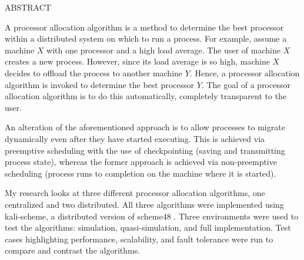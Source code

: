 ABSTRACT

A processor allocation algorithm is a method to determine the best processor
within a distributed system on which to run a process.  For example, assume
a machine $X$ with one processor and a high load average.  The user of
machine $X$ creates a new process.  However, since its load average is so
high, machine $X$ decides to offload the process to another machine $Y$.
Hence, a processor allocation algorithm is invoked to determine the best
processor $Y$.  The goal of a processor allocation algorithm is to do this
automatically, completely transparent to the user.

An alteration of the aforementioned approach is to allow processes to
migrate dynamically even after they have started executing.  This is
achieved via preemptive scheduling with the use of checkpointing (saving and
transmitting process state), whereas the former approach is achieved via
non-preemptive scheduling (process runs to completion on the machine where
it is started).

My research looks at three different processor allocation algorithms, one
centralized and two distributed.  All three algorithms were implemented
using kali-scheme, a distributed version of scheme48 \cite{kali}.  Three
environments were used to test the algorithms: simulation, quasi-simulation,
and full implementation.  Test cases highlighting performance, scalability,
and fault tolerance were run to compare and contrast the algorithms.

